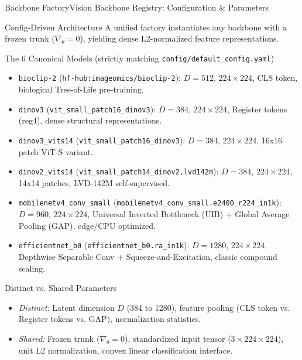 \begin{frame}{Backbone Factory}{Vision Backbone Registry: Configuration \& Parameters}
    \vspace{-0.4cm}
    \begin{block}{Config-Driven Architecture}
        \tiny
        A unified factory instantiates any backbone with a frozen trunk ($\nabla_\theta = 0$), yielding dense L2-normalized feature representations.
    \end{block}

    \vspace{-0.4cm}
    \begin{block}{The 6 Canonical Models (strictly matching \texttt{config/default\_config.yaml})}
        \tiny
        \begin{itemize}
            \item \texttt{bioclip-2} (\texttt{hf-hub:imageomics/bioclip-2}): $D=512$, $224 \times 224$, CLS token, biological Tree-of-Life pre-training.
            \item \texttt{dinov3} (\texttt{vit\_small\_patch16\_dinov3}): $D=384$, $224 \times 224$, Register tokens (reg4), dense structural representations.
            \item \texttt{dinov3\_vits14} (\texttt{vit\_small\_patch16\_dinov3}): $D=384$, $224 \times 224$, 16x16 patch ViT-S variant.
            \item \texttt{dinov2\_vits14} (\texttt{vit\_small\_patch14\_dinov2.lvd142m}): $D=384$, $224 \times 224$, 14x14 patches, LVD-142M self-supervised.
            \item \texttt{mobilenetv4\_conv\_small} (\texttt{mobilenetv4\_conv\_small.e2400\_r224\_in1k}): $D=960$, $224 \times 224$, Universal Inverted Bottleneck (UIB) + Global Average Pooling (GAP), edge/CPU optimized.
            \item \texttt{efficientnet\_b0} (\texttt{efficientnet\_b0.ra\_in1k}): $D=1280$, $224 \times 224$, Depthwise Separable Conv + Squeeze-and-Excitation, classic compound scaling.
        \end{itemize}
    \end{block}

    \vspace{-0.4cm}
    \begin{block}{Distinct vs. Shared Parameters}
        \tiny
        \begin{itemize}
            \item \emph{Distinct:} Latent dimension $D$ (384 to 1280), feature pooling (CLS token vs. Register tokens vs. GAP), normalization statistics.
            \item \emph{Shared:} Frozen trunk ($\nabla_\theta = 0$), standardized input tensor ($3 \times 224 \times 224$), unit L2 normalization, convex linear classification interface.
        \end{itemize}
    \end{block}


\end{frame}
